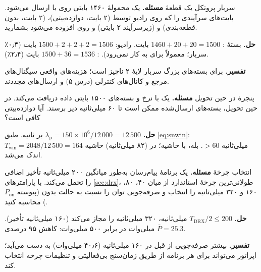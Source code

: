 \documentclass[11pt,a4paper]{article}
\begin{document}
\begin{examplebox}{سربار پروتکل یک قطعهٔ }\label{ex:overhead}
\textbf{مسئله.} یک محمولهٔ  ۱۴۶۰ بایتی روی  با  ارسال می‌شود. بایت‌های سرآیندی را
که روی رادیو توسط  (۲ بایت،  دوازده‌بیتی)،  (۲ بایت، بدون قطعه‌بندی) و 
(زیرسرآیند ۲ بایتی) و روی  افزوده می‌شود بشمارید.

\textbf{حل.} بستهٔ : $1460 + 20 + 20 = 1500$ بایت. رادیو: $1500 + 2 + 2 + 2 = 1506$ بایت (۰٫۴٪ سربار؛
 معمولاً برای  به کار نمی‌رود). : $1500 + 36 = 1536$ بایت (۲٫۴٪).

\textbf{تفسیر.} برای بسته‌های بزرگ سربار لایهٔ ۲ ناچیز است؛ هزینه‌های واقعی سیگنال‌های مرجع و کانال‌های
کنترلی  (درس ۵) و ارسال‌های مجددند.
\end{examplebox}

\begin{examplebox}{پنجرهٔ  در حین تحویل}\label{ex:pdcp}
\textbf{مسئله.} یک  با نرخ  و بسته‌های ۱۵۰۰ بایتی داده دریافت می‌کند. در حین تحویل،
بسته‌های ارسال‌شده ممکن است تا ۶۰ میلی‌ثانیه دیر برسند. آیا  دوازده‌بیتی  کافی است؟

\textbf{حل.} $\lambda_\mathrm{p} = 150\times10^6/12\,000 = 12\,500$  بر ثانیه. طبق \cref{eq:snwin}:
$T_{\mathrm{win}} = 2048/12\,500 = 164$ میلی‌ثانیه $> 60$. بله، با حاشیه؛ در  (۸۲ میلی‌ثانیه)
حاشیه اندک می‌شد.
\end{examplebox}

\begin{examplebox}{انتخاب چرخهٔ }\label{ex:drx}
\textbf{مسئله.} یک برنامهٔ پیام‌رسان به‌طور میانگین ۲۰۰ میلی‌ثانیه تأخیر اضافی را تحمل می‌کند. با پارامترهای
\cref{sec:drx}، طولانی‌ترین چرخهٔ استاندارد  از میان ۴۰، ۸۰، ۱۶۰ و ۳۲۰ میلی‌ثانیه را انتخاب و
صرفه‌جویی توان را نسبت به حالت بدون  (پیوسته $P_{\mathrm{on}}$) محاسبه کنید.

\textbf{حل.} $T_{\mathrm{DRX}}/2 \le 200$ میلی‌ثانیه، ۳۲۰ میلی‌ثانیه را مجاز می‌کند (۱۶۰ میلی‌ثانیه تأخیر).
$\bar P = 25.3$ میلی‌وات در برابر ۵۰۰ میلی‌وات: کاهش ۹۵ درصدی.

\textbf{تفسیر.} بیشتر صرفه‌جویی از قبل در ۱۶۰ میلی‌ثانیه (۴۰٫۶ میلی‌وات) به دست می‌آید؛ اپراتور می‌تواند برای
هر برنامه از طریق زمان‌سنج بی‌فعالیتی و تنظیمات چرخه انتخاب کند.
\end{examplebox}

\end{document}
